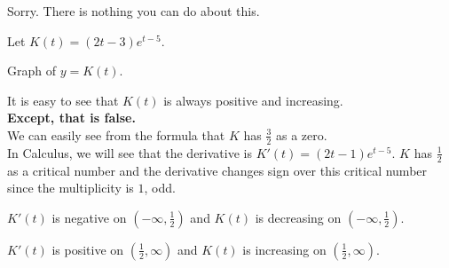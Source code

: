 \documentclass{ximera}
\begin{document}
Sorry.  There is nothing you can do about this.





\begin{example}


Let $K(t) = (2t-3)e^{t-5}$.


Graph of $y = K(t)$.



\begin{image}
\end{image}



It is easy to see that $K(t)$ is always positive and increasing. \\

\textbf{\textcolor{red!80!black}{Except, that is false.}} \\

We can easily see from the formula that $K$ has $\frac{3}{2}$ as a zero.\\


In Calculus, we will see that the derivative is $K'(t) = (2t-1)e^{t-5}$.   $K$ has $\frac{1}{2}$ as a critical number and the derivative changes sign over this critical number since the multiplicity is $1$, odd.

$K'(t)$ is negative on $\left( -\infty, \frac{1}{2} \right)$ and $K(t)$ is decreasing on $\left( -\infty, \frac{1}{2} \right)$.

$K'(t)$ is positive on $\left(\frac{1}{2}, \infty \right)$ and $K(t)$ is increasing on $\left(\frac{1}{2}, \infty \right)$.



\end{example}
\end{document}
